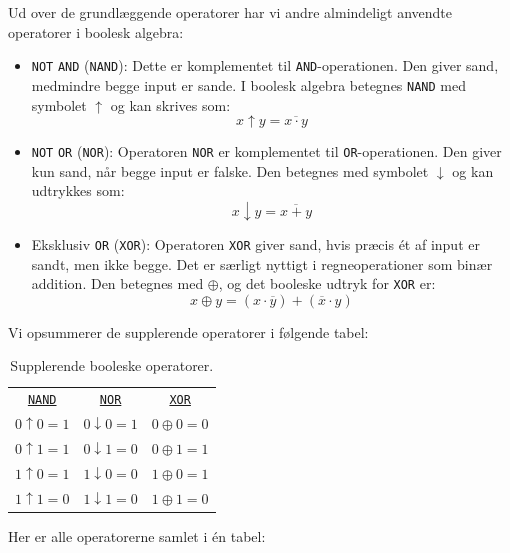 Ud over de grundlæggende operatorer har vi andre almindeligt anvendte operatorer i boolesk algebra:

\begin{itemize}
\setlength{\itemsep}{10pt}
    \item \texttt{NOT} \texttt{AND} (\texttt{NAND}): Dette er komplementet til \texttt{AND}-operationen. Den giver sand, medmindre begge input er sande. I boolesk algebra betegnes \texttt{NAND} med symbolet $\uparrow$ og kan skrives som: \[
        x \uparrow y = \overline{x \cdot y}
        \]

    \item \texttt{NOT} \texttt{OR} (\texttt{NOR}): Operatoren \texttt{NOR} er komplementet til \texttt{OR}-operationen. Den giver kun sand, når begge input er falske. Den betegnes med symbolet $\downarrow$ og kan udtrykkes som:
        \[
        x \downarrow y = \overline{x + y}
        \]

    \item Eksklusiv \texttt{OR} (\texttt{XOR}): Operatoren \texttt{XOR} giver sand, hvis præcis ét af input er sandt, men ikke begge. Det er særligt nyttigt i regneoperationer som binær addition. Den betegnes med $\oplus$, og det booleske udtryk for \texttt{XOR} er:
        \[
        x \oplus y = (x \cdot \overline{y}) + (\overline{x} \cdot y)
        \]

\end{itemize}

Vi opsummerer de supplerende operatorer i følgende tabel:

\begin{table}[h!]
\begin{center}
\begin{tabular}{ccc}
\underline{\texttt{NAND}} & \underline{\texttt{NOR}} & \underline{\texttt{XOR}} \\
$0 \uparrow 0 = 1$ & $0 \downarrow 0 = 1$ & $0 \oplus 0 = 0$ \\
$0 \uparrow 1 = 1$ & $0 \downarrow 1 = 0$ & $0 \oplus 1 = 1$ \\
$1 \uparrow 0 = 1$ & $1 \downarrow 0 = 0$ & $1 \oplus 0 = 1$ \\
$1 \uparrow 1 = 0$ & $1 \downarrow 1 = 0$ & $1 \oplus 1 = 0$ \\
\end{tabular}
\end{center}
    \caption{Supplerende booleske operatorer.}
    \label{tab:addibool}
\end{table}


Her er alle operatorerne samlet i én tabel:

